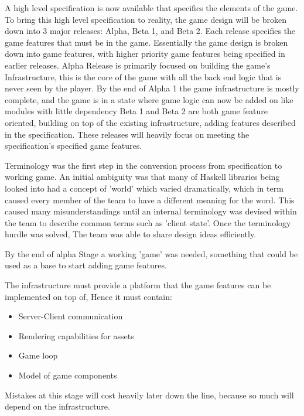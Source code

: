 A high level specification is now available that specifics the elements of the game. To bring this high level specification to reality, the game design will be broken down into 3 major releases: Alpha, Beta 1, and Beta 2. Each release specifies the game features that must be in the game. Essentially the game design is broken down into game features, with higher priority game features being specified in earlier releases.
Alpha Release is primarily focused on building the game's Infrastructure, this is the core of the game with all the back end logic that is never seen by the player. By the end of Alpha 1 the game infrastructure is mostly complete, and the game is in a state where game logic can now be added on like modules with little dependency 
Beta 1 and Beta 2 are both game feature oriented, building on top of the existing infrastructure, adding features described in the specification. These releases will heavily focus on meeting the specification's specified game features.

Terminology was the first step in the conversion process from specification to working game. 
An initial ambiguity was that many of Haskell libraries being looked into had a concept of 'world' which varied dramatically, which in term caused every member of the team to have a different meaning for the word. This caused many misunderstandings until an internal terminology was devised within the team to describe common terms such as 'client state'. Once the terminology hurdle was solved, The team was able to share design ideas efficiently.

By the end of alpha Stage a working 'game' was needed, something that could be used as a base to start adding game features.

The infrastructure must provide a platform that the game features can be implemented on top of, Hence it must contain:
\begin{itemize}
\item Server-Client communication
\item Rendering capabilities for assets
\item Game loop
\item Model of game components
\end{itemize}

Mistakes at this stage will cost heavily later down the line, because so much will depend on the infrastructure. 

